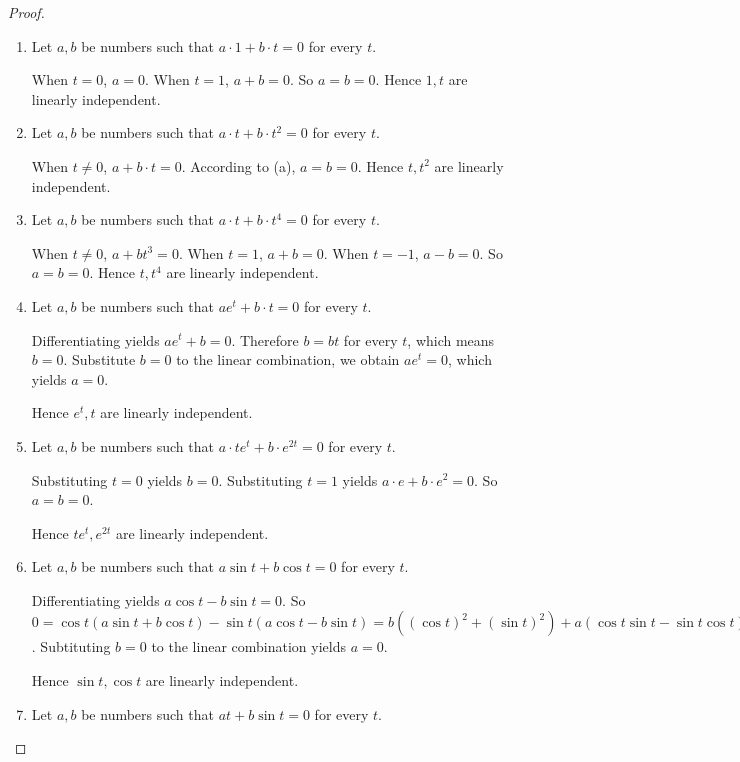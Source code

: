 \begin{proof}
    \begin{enumerate}[label={(\alph*)}]
        \item Let $a, b$ be numbers such that $a\cdot 1 + b\cdot t = 0$ for every $t$.

              When $t = 0$, $a = 0$. When $t = 1$, $a + b = 0$. So $a = b = 0$. Hence $1, t$ are linearly independent.
        \item Let $a, b$ be numbers such that $a\cdot t + b\cdot t^{2} = 0$ for every $t$.

              When $t\ne 0$, $a + b\cdot t = 0$. According to (a), $a = b = 0$. Hence $t, t^{2}$ are linearly independent.
        \item Let $a, b$ be numbers such that $a\cdot t + b\cdot t^{4} = 0$ for every $t$.

              When $t\ne 0$, $a + b{t}^{3} = 0$. When $t = 1$, $a + b = 0$. When $t = -1$, $a - b = 0$. So $a = b = 0$. Hence $t, t^{4}$ are linearly independent.
        \item Let $a, b$ be numbers such that $a{e}^{t} + b\cdot t = 0$ for every $t$.

              Differentiating yields $a{e}^{t} + b = 0$. Therefore $b = bt$ for every $t$, which means $b = 0$. Substitute $b = 0$ to the linear combination, we obtain $a{e}^{t} = 0$, which yields $a = 0$.

              Hence $e^{t}, t$ are linearly independent.
        \item Let $a, b$ be numbers such that $a\cdot t{e}^{t} + b\cdot e^{2t} = 0$ for every $t$.

              Substituting $t = 0$ yields $b = 0$. Substituting $t = 1$ yields $a\cdot e + b\cdot e^{2} = 0$. So $a = b = 0$.

              Hence $t{e}^{t}, e^{2t}$ are linearly independent.
        \item Let $a, b$ be numbers such that $a\sin t + b\cos t = 0$ for every $t$.

              Differentiating yields $a\cos t - b\sin t = 0$. So $0 = \cos t (a\sin t + b\cos t) - \sin t(a\cos t - b\sin t) = b({(\cos t)}^{2} + {(\sin t)}^{2}) + a(\cos t\sin t - \sin t\cos t) = b$. Subtituting $b = 0$ to the linear combination yields $a = 0$.

              Hence $\sin t, \cos t$ are linearly independent.
        \item Let $a, b$ be numbers such that $at + b\sin t = 0$ for every $t$.


\end{enumerate}
\end{proof}

